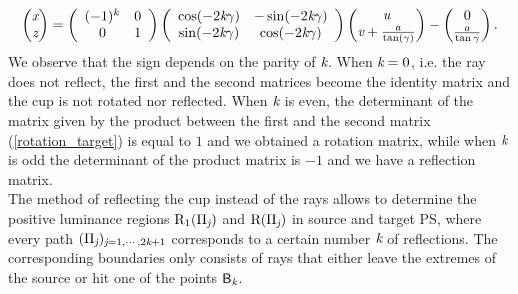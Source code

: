 \begin{equation} \label{rotation_target}\begin{pmatrix} \textit{x}\\ \textit{z}
\end{pmatrix} = \left(\begin{array}{cc}(-1)^k & 0  \\ 0 & 1\end{array}\right)
\left(\begin{array}{cc}\cos(-2\textit{k}\gamma) & -\sin(-2\textit{k}\gamma) \\\sin(-2\textit{k}\gamma) & \cos(-2\textit{k}\gamma)\end{array}\right)\begin{pmatrix} \textit{u} \\
 \textit{v}+\frac{a}{\tan(\gamma)}\end{pmatrix}-\begin{pmatrix}0 \\ \frac{a}{\tan\gamma}\end{pmatrix}.
\end{equation} We observe that the sign depends on the parity of $\textit{k}$. When $\textit{k}=0$, i.e. the ray does not reflect, the first and the second matrices become the identity matrix and the cup is not rotated nor reflected. When $\textit{k}$ is even, the determinant of the matrix given by the product between the first and the second matrix (\ref{rotation_target}) is equal to $1$ and we obtained a rotation matrix, while when $\textit{k}$ is odd the determinant of the product matrix is $-1$ and we have a reflection matrix.
\\ \indent
The method of reflecting the cup instead of the rays allows to determine the positive luminance regions $\mbox{$\textup{R}$}_1(\Pi_{\textit{j}})$ and $\mbox{$\textup{R}$}(\Pi_{\textit{j}})$ in source and target PS, where every path $(\Pi_{\textit{j}})_{\textit{j}=1, \cdots, 2\textit{k}+1}$ corresponds to a certain number $\textit{k}$ of reflections. The corresponding boundaries only consists of rays that either leave the extremes of the source or hit one of the points $\textsf{B}_{\textit{k}}$. 

